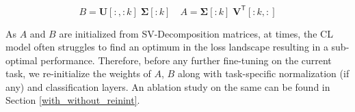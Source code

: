 \documentclass[10pt]{article} %
\newtheorem{proposition}[theorem]{Proposition}
\begin{document}
\begin{equation}
\label{eqn:a_b_lora}
B = \mathbf{U} [:, :k] \; \mathbf{\Sigma} [:k] \quad A = \mathbf{\Sigma}[:k]\; \mathbf{V}^{\mathsf{T}}[:k, :]
\end{equation}

As $A$ and $B$ are initialized from SV-Decomposition matrices, at times, the CL model often struggles to find an optimum in the loss landscape resulting in a sub-optimal performance. Therefore, before any further fine-tuning on the current task, we re-initialize the weights of $A$, $B$ along with task-specific normalization (if any) and classification layers. An ablation study on the same can be found in Section \ref{with_without_reinint}. 




\end{document}

